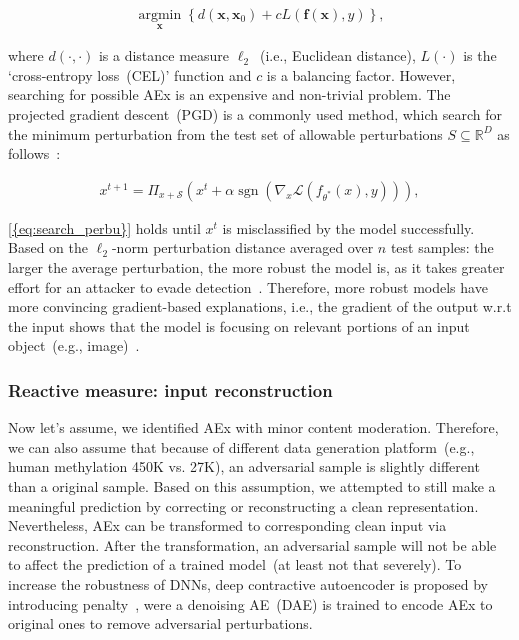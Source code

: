 \vspace{-6mm}
\begin{align}
    \underset{\boldsymbol{x}}{\operatorname{argmin}}\left\{d\left(\boldsymbol{x}, \boldsymbol{x}_{0}\right)+c {L}(\boldsymbol{f}(\boldsymbol{x}), y)\right\},
\end{align}

\hspace*{3.5mm} where $d(\cdot, \cdot)$ is a distance measure $\ell_{2}$~(i.e., Euclidean distance), ${L}(\cdot)$ is the `cross-entropy loss~(CEL)' function and $c$ is a balancing factor. However, searching for possible AEx is an expensive and non-trivial problem. The projected gradient descent~(PGD) is a commonly used method, which search for the minimum perturbation from the test set of allowable perturbations ${S} \subseteq \mathbb{R}^{D}$ as follows~\cite{bhatt2020explainable}: 

\vspace{-6mm}
\begin{align}
    x^{t+1}=\Pi_{x+\mathcal{S}}\left(x^{t}+\alpha \operatorname{sgn}\left(\nabla_{x} \mathcal{L}\left(f_{\theta^{*}}(x), y\right)\right)\right),
    \label{eq:search_perbu}
\end{align}

\hspace*{3.5mm}\cref{{eq:search_perbu}} holds until $x^{t}$ is misclassified by the model successfully. Based on the $\ell_{2}$-norm perturbation distance averaged over $n$ test samples: the larger the average perturbation, the more robust the model is, as it takes greater effort for an attacker to evade detection~\cite{bhatt2020explainable,yuan2019adversarial}. 
Therefore, more robust models have more convincing gradient-based explanations, i.e., the gradient of the output w.r.t the input shows that the model is focusing on relevant portions of an input object~(e.g., image)~\cite{bhatt2020explainable}.

\subsubsection{Reactive measure: input reconstruction}
Now let's assume, we identified AEx with minor content moderation. Therefore, we can also assume that because of different data generation platform~(e.g., human methylation 450K vs. 27K), an adversarial sample is slightly different than a original sample. Based on this assumption, we attempted to still make a meaningful prediction by correcting or reconstructing a clean representation. Nevertheless, AEx can be transformed to corresponding clean input via reconstruction. After the transformation, an adversarial sample will not be able to affect the prediction of a trained model~(at least not that severely). 
To increase the robustness of DNNs, deep contractive autoencoder is proposed by introducing penalty~\cite{meng2017magnet}, were a denoising AE~(DAE) is trained to encode AEx to original ones to remove adversarial perturbations. 

